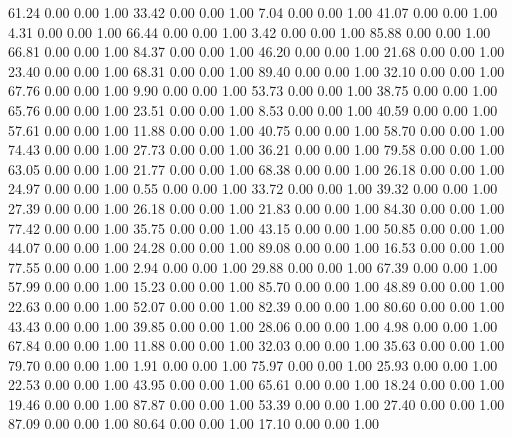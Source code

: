    61.24   0.00   0.00   1.00
   33.42   0.00   0.00   1.00
    7.04   0.00   0.00   1.00
   41.07   0.00   0.00   1.00
    4.31   0.00   0.00   1.00
   66.44   0.00   0.00   1.00
    3.42   0.00   0.00   1.00
   85.88   0.00   0.00   1.00
   66.81   0.00   0.00   1.00
   84.37   0.00   0.00   1.00
   46.20   0.00   0.00   1.00
   21.68   0.00   0.00   1.00
   23.40   0.00   0.00   1.00
   68.31   0.00   0.00   1.00
   89.40   0.00   0.00   1.00
   32.10   0.00   0.00   1.00
   67.76   0.00   0.00   1.00
    9.90   0.00   0.00   1.00
   53.73   0.00   0.00   1.00
   38.75   0.00   0.00   1.00
   65.76   0.00   0.00   1.00
   23.51   0.00   0.00   1.00
    8.53   0.00   0.00   1.00
   40.59   0.00   0.00   1.00
   57.61   0.00   0.00   1.00
   11.88   0.00   0.00   1.00
   40.75   0.00   0.00   1.00
   58.70   0.00   0.00   1.00
   74.43   0.00   0.00   1.00
   27.73   0.00   0.00   1.00
   36.21   0.00   0.00   1.00
   79.58   0.00   0.00   1.00
   63.05   0.00   0.00   1.00
   21.77   0.00   0.00   1.00
   68.38   0.00   0.00   1.00
   26.18   0.00   0.00   1.00
   24.97   0.00   0.00   1.00
    0.55   0.00   0.00   1.00
   33.72   0.00   0.00   1.00
   39.32   0.00   0.00   1.00
   27.39   0.00   0.00   1.00
   26.18   0.00   0.00   1.00
   21.83   0.00   0.00   1.00
   84.30   0.00   0.00   1.00
   77.42   0.00   0.00   1.00
   35.75   0.00   0.00   1.00
   43.15   0.00   0.00   1.00
   50.85   0.00   0.00   1.00
   44.07   0.00   0.00   1.00
   24.28   0.00   0.00   1.00
   89.08   0.00   0.00   1.00
   16.53   0.00   0.00   1.00
   77.55   0.00   0.00   1.00
    2.94   0.00   0.00   1.00
   29.88   0.00   0.00   1.00
   67.39   0.00   0.00   1.00
   57.99   0.00   0.00   1.00
   15.23   0.00   0.00   1.00
   85.70   0.00   0.00   1.00
   48.89   0.00   0.00   1.00
   22.63   0.00   0.00   1.00
   52.07   0.00   0.00   1.00
   82.39   0.00   0.00   1.00
   80.60   0.00   0.00   1.00
   43.43   0.00   0.00   1.00
   39.85   0.00   0.00   1.00
   28.06   0.00   0.00   1.00
    4.98   0.00   0.00   1.00
   67.84   0.00   0.00   1.00
   11.88   0.00   0.00   1.00
   32.03   0.00   0.00   1.00
   35.63   0.00   0.00   1.00
   79.70   0.00   0.00   1.00
    1.91   0.00   0.00   1.00
   75.97   0.00   0.00   1.00
   25.93   0.00   0.00   1.00
   22.53   0.00   0.00   1.00
   43.95   0.00   0.00   1.00
   65.61   0.00   0.00   1.00
   18.24   0.00   0.00   1.00
   19.46   0.00   0.00   1.00
   87.87   0.00   0.00   1.00
   53.39   0.00   0.00   1.00
   27.40   0.00   0.00   1.00
   87.09   0.00   0.00   1.00
   80.64   0.00   0.00   1.00
   17.10   0.00   0.00   1.00
